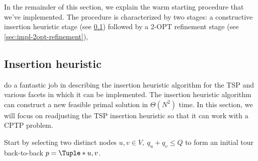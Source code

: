 In the remainder of this section,
we explain the warm starting procedure that we've implemented.
The procedure is characterized by two stages:
a constructive insertion heuristic stage (see \cref{sec:impl-insertion-heuristic})
followed by a 2-OPT refinement stage (see \cref{sec:impl-2opt-refinement}),

\subsection{Insertion heuristic}
\label{sec:impl-insertion-heuristic}

\cite{rosenkrantz1977} do a fantastic job in describing the insertion heuristic algorithm
for the TSP and various facets in which it can be implemented.
The insertion heuristic algorithm
can construct a new feasible primal solution in $\Theta(N^2)$ time.
In this section,
we will focus on readjusting the TSP insertion heuristic so that it can work with a CPTP problem.

\medskip

Start by selecting two distinct nodes $u, v \in V,\ q_u + q_v \le Q$
to form an initial tour back-to-back $p = \Tuple*{u, v}$.

